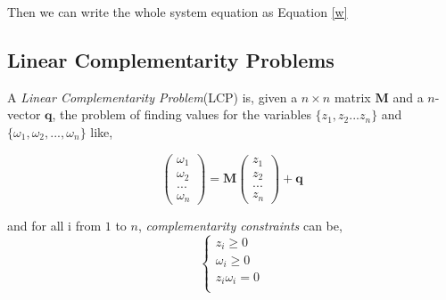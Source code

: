         Then we can write the whole system equation as Equation \ref{w}
    
    \subsection{Linear Complementarity Problems}
        A \textit{Linear Complementarity Problem}(LCP) is, given a $n \times n$ matrix $\pmb{M}$ and a $n$-vector $\pmb{q}$, the problem of finding values for the variables $\{z_1, z_2 ... z_n\}$ and $\{\omega_1, \omega_2, ... , \omega_n\}$ like,

        \begin{equation}
            \left(\begin{array}{c} \omega_1 \\ \omega_2 \\ ... \\ \omega_n \end{array} \right) = \pmb{M} \left(\begin{array}{c} z_1 \\ z_2 \\ ... \\ z_n \end{array}\right) + \pmb{q}
        \end{equation}

        and for all i from $1$ to $n$, \textit{complementarity constraints} can be,
        \begin{equation}
            \begin{cases}
                z_i \ge 0 \\
                \omega_i \ge 0 \\
                z_i \omega_i = 0 \\
            \end{cases}
        \end{equation}

      